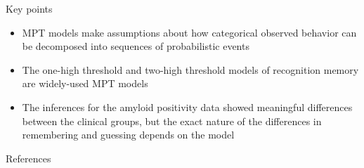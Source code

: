 \documentclass[10pt]{beamer}
\begin{document}
\begin{frame}[fragile]{Key points}
	\begin{itemize}
		\item MPT models make assumptions about how categorical observed behavior can be decomposed into sequences of probabilistic events
		\item The one-high threshold and two-high threshold models of recognition memory are widely-used MPT models
		\item The inferences for the amyloid positivity data showed meaningful differences between the clinical groups, but the exact nature of the differences in remembering and guessing depends on the model
	\end{itemize}
	\vspace{7em}
\end{frame}

\begin{frame}[allowframebreaks]{References}


\end{frame}
\end{document}

